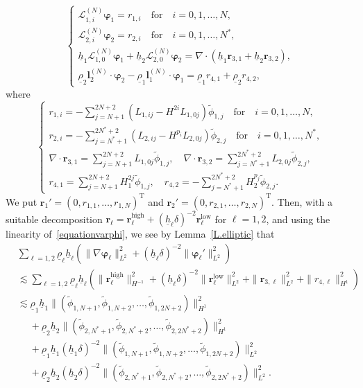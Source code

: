 \documentclass[11pt,leqno]{article}
\numberwithin{equation}{section}
\numberwithin{figure}{section}
\begin{document}
%
\[
\begin{cases}
 \mathcal{L}_{1,i}^{(N)}\bm{\varphi}_1 = r_{1,i} \quad\mbox{for}\quad i=0,1,\ldots,N, \\
 \mathcal{L}_{2,i}^{(N)}\bm{\varphi}_2 = r_{2,i} \quad\mbox{for}\quad i=0,1,\ldots,N^*, \\
 \underline{h}_1\mathcal{L}_{1,0}^{(N)}\bm{\varphi}_1 + \underline{h}_2\mathcal{L}_{2,0}^{(N)}\bm{\varphi}_2
  = \nabla\cdot(\underline{h}_1\bm{r}_{3,1}+\underline{h}_2\bm{r}_{3,2}), \\
 \underline{\rho}_2\bm{l}_2^{(N)}\cdot\bm{\varphi}_2 - \underline{\rho}_1\bm{l}_1^{(N)}\cdot\bm{\varphi}_1
  = \underline{\rho}_1r_{4,1}+\underline{\rho}_2r_{4,2},
\end{cases}
\]
%
where 
%
\[
\begin{cases}
 r_{1,i} = -\sum_{j=N+1}^{2N+2}(L_{1,ij}-H^{2i}L_{1,0j})\tilde{\phi}_{1,j} \quad\mbox{for}\quad i=0,1,\ldots,N, \\
 r_{2,i} = -\sum_{j=N^*+1}^{2N^*+2}(L_{2,ij}-H^{p_i}L_{2,0j})\tilde{\phi}_{2,j} \quad\mbox{for}\quad i=0,1,\ldots,N^*, \\
 \nabla\cdot\bm{r}_{3,1} = \sum_{j=N+1}^{2N+2}L_{1,0j}\tilde{\phi}_{1,j}, \quad
 \nabla\cdot\bm{r}_{3,2} = \sum_{j=N^*+1}^{2N^*+2}L_{2,0j}\tilde{\phi}_{2,j}, \\
 r_{4,1} = \sum_{j=N+1}^{2N+2}H_1^{2j}\tilde{\phi}_{1,j}, \quad
 r_{4,2} = -\sum_{j=N^*+1}^{2N^*+2}H_2^{p_j}\tilde{\phi}_{2,j}.
\end{cases}
\]
%
We put $\bm{r}_1'=(0,r_{1,1},\ldots,r_{1,N})^\mathrm{T}$ and $\bm{r}_2'=(0,r_{2,1},\ldots,r_{2,N})^\mathrm{T}$. 
Then, with a suitable decomposition 
$\bm{r}_\ell=\bm{r}_\ell^\mathrm{high}+(\underline{h}_\ell\delta)^{-2}\bm{r}_\ell^\mathrm{low}$ for $\ell=1,2$, 
and using the linearity of~\eqref{equationvarphi}, we see by Lemma~\ref{L.elliptic} that 
%
\begin{align*}
& \sum_{\ell=1,2}\underline{\rho}_\ell\underline{h}_\ell
 ( \|\nabla\bm{\varphi}_\ell\|_{L^2}^2 + (\underline{h}_\ell\delta)^{-2}\|\bm{\varphi}_\ell'\|_{L^2}^2 ) \\
&\lesssim \sum_{\ell=1,2}\underline{\rho}_\ell\underline{h}_\ell
 ( \|\bm{r}_\ell^\mathrm{high}\|_{H^{-1}}^2 + (\underline{h}_\ell\delta)^{-2}\|\bm{r}_\ell^\mathrm{low}\|_{L^2}^2
  + \|\bm{r}_{3,\ell}\|_{L^2}^2 + \|r_{4,\ell}\|_{H^1}^2 ) \\
&\lesssim \underline{\rho}_1\underline{h}_1
\|(\tilde{\phi}_{1,N+1},\tilde{\phi}_{1,N+2},\ldots,\tilde{\phi}_{1,2N+2})\|_{H^1}^2 \\
&\quad\;
 + \underline{\rho}_2\underline{h}_2
  \|(\tilde{\phi}_{2,N^*+1},\tilde{\phi}_{2,N^*+2},\ldots,\tilde{\phi}_{2,2N^*+2})\|_{H^1}^2 \\
&\quad\;
 + \underline{\rho}_1\underline{h}_1(\underline{h}_1\delta)^{-2}
  \|(\tilde{\phi}_{1,N+1},\tilde{\phi}_{1,N+2},\ldots,\tilde{\phi}_{1,2N+2})\|_{L^2}^2 \\
&\quad\;
 + \underline{\rho}_2\underline{h}_2(\underline{h}_2\delta)^{-2}
  \|(\tilde{\phi}_{2,N^*+1},\tilde{\phi}_{2,N^*+2},\ldots,\tilde{\phi}_{2,2N^*+2})\|_{L^2}^2.
\end{align*}
\end{document}
